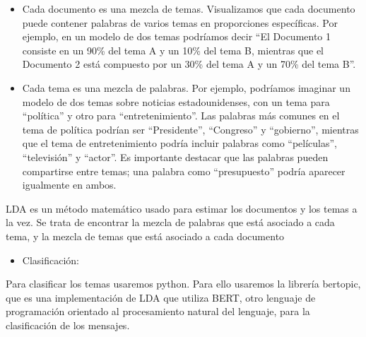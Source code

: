 \documentclass[
  letterpaper,
  DIV=11,
  numbers=noendperiod]{scrartcl}
\providecommand{\tightlist}{%
  \setlength{\itemsep}{0pt}\setlength{\parskip}{0pt}}\usepackage{longtable,booktabs,array}
\begin{document}
\begin{itemize}
\item
  Cada documento es una mezcla de temas. Visualizamos que cada documento
  puede contener palabras de varios temas en proporciones específicas.
  Por ejemplo, en un modelo de dos temas podríamos decir ``El Documento
  1 consiste en un 90\% del tema A y un 10\% del tema B, mientras que el
  Documento 2 está compuesto por un 30\% del tema A y un 70\% del tema
  B''.
\item
  Cada tema es una mezcla de palabras. Por ejemplo, podríamos imaginar
  un modelo de dos temas sobre noticias estadounidenses, con un tema
  para ``política'' y otro para ``entretenimiento''. Las palabras más
  comunes en el tema de política podrían ser ``Presidente'',
  ``Congreso'' y ``gobierno'', mientras que el tema de entretenimiento
  podría incluir palabras como ``películas'', ``televisión'' y
  ``actor''. Es importante destacar que las palabras pueden compartirse
  entre temas; una palabra como ``presupuesto'' podría aparecer
  igualmente en ambos.
\end{itemize}

LDA es un método matemático usado para estimar los documentos y los
temas a la vez. Se trata de encontrar la mezcla de palabras que está
asociado a cada tema, y la mezcla de temas que está asociado a cada
documento

\begin{itemize}
\tightlist
\item
  Clasificación:
\end{itemize}

Para clasificar los temas usaremos python. Para ello usaremos la
librería bertopic, que es una implementación de LDA que utiliza BERT,
otro lenguaje de programación orientado al procesamiento natural del
lenguaje, para la clasificación de los mensajes.
\end{document}
